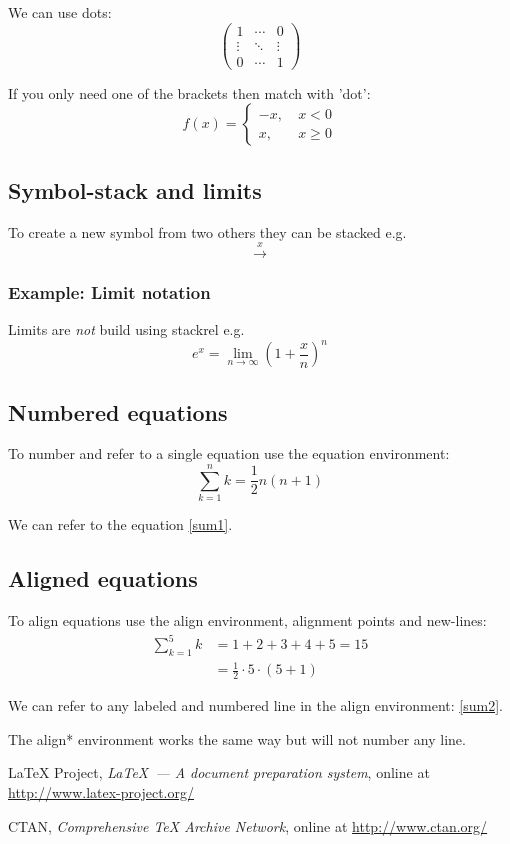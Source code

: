 \documentclass[a4paper,12pt]{extarticle}
\begin{document}
We can use dots:
\[
\left(
\begin{array}{ccc}
1 & \cdots & 0 \\
\vdots & \ddots & \vdots \\
0 & \cdots & 1
\end{array}
\right)
\]

If you only need one of the brackets then match with 'dot':
\[
f(x) = \left\{\begin{array}{rl}
-x, \ &x < 0 \\
x, \ &x \geq 0
\end{array}
\right.
\]

\subsection{Symbol-stack and limits}

To create a new symbol from two others they can be stacked e.g.
\[
\stackrel{x}{\longrightarrow}
\]

\subsubsection{Example: Limit notation}

Limits are \emph{not} build using stackrel e.g. 
\[
e^x = \lim_{n\rightarrow \infty} \left(1 + \frac{x}{n}\right)^n
\]

\subsection{Numbered equations}

To number and refer to a single equation use the equation environment:
\begin{equation}
\label{sum1}
\sum_{k=1}^n k = \frac{1}{2}n(n+1)
\end{equation}

We can refer to the equation \eqref{sum1}.

\subsection{Aligned equations}

To align equations use the align environment, alignment points and new-lines:
\begin{align}
\sum_{k=1}^5 k &= 1 + 2 + 3 + 4 + 5 = 15\nonumber\\
\label{sum2}
&=\frac{1}{2}\cdot 5 \cdot (5+1)
\end{align}

We can refer to any labeled and numbered line in the align environment: \eqref{sum2}.

The align* environment works the same way but will not number any line.

\begin{thebibliography}{99}
LaTeX Project, \emph{\LaTeX\ --- A document preparation system},
online at \url{http://www.latex-project.org/}

CTAN, \emph{Comprehensive TeX Archive Network}, online at \url{http://www.ctan.org/}
\end{thebibliography}
\end{document}
